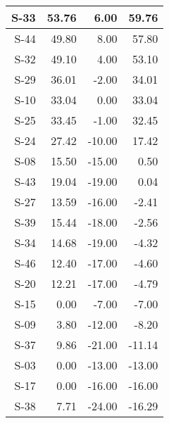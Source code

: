 \begin{tabular}{ | r | r | r | r | }
    \hline
                  S-33  &           53.76  &            6.00  &           59.76  \\
    \hline
                  S-44  &           49.80  &            8.00  &           57.80  \\
    \hline
                  S-32  &           49.10  &            4.00  &           53.10  \\
    \hline
                  S-29  &           36.01  &           -2.00  &           34.01  \\
    \hline
                  S-10  &           33.04  &            0.00  &           33.04  \\
    \hline
                  S-25  &           33.45  &           -1.00  &           32.45  \\
    \hline
                  S-24  &           27.42  &          -10.00  &           17.42  \\
    \hline
                  S-08  &           15.50  &          -15.00  &            0.50  \\
    \hline
                  S-43  &           19.04  &          -19.00  &            0.04  \\
    \hline
                  S-27  &           13.59  &          -16.00  &           -2.41  \\
    \hline
                  S-39  &           15.44  &          -18.00  &           -2.56  \\
    \hline
                  S-34  &           14.68  &          -19.00  &           -4.32  \\
    \hline
                  S-46  &           12.40  &          -17.00  &           -4.60  \\
    \hline
                  S-20  &           12.21  &          -17.00  &           -4.79  \\
    \hline
                  S-15  &            0.00  &           -7.00  &           -7.00  \\
    \hline
                  S-09  &            3.80  &          -12.00  &           -8.20  \\
    \hline
                  S-37  &            9.86  &          -21.00  &          -11.14  \\
    \hline
                  S-03  &            0.00  &          -13.00  &          -13.00  \\
    \hline
                  S-17  &            0.00  &          -16.00  &          -16.00  \\
    \hline
                  S-38  &            7.71  &          -24.00  &          -16.29  \\

\end{tabular}
